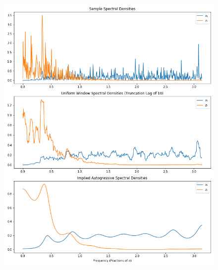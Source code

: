 \documentclass[oneside, a4paper]{amsart}
\begin{document}
\begin{figure}[!h]
\includegraphics[width=\textwidth]{q4-fig}
\caption{}
\label{q4-fig}
\end{figure}
\end{document}
